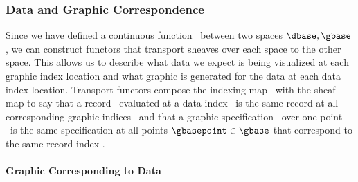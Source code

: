 \documentclass[journal]{IEEEtran}
\theoremstyle{definition}
\theoremstyle{remark}
\begin{document}
\subsubsection{Data and Graphic Correspondence}
Since we have defined a continuous function \vindex\ between two spaces $\dbase, \gbase$, we can construct functors that transport sheaves over each space to the other space\cite{harder2008lectures}. This allows us to describe what data we expect is being visualized at each graphic index location and what graphic is generated for the data at each data index location. Transport functors compose the indexing map \vindex\ with the sheaf map to say that a record \dsection\ evaluated at a data index \dbasepoint\ is the same record at all corresponding  graphic indices \gbasepoint\ and that a graphic specification \gsection\ over one point \gbasepoint\ is the same specification at all points $\gbasepoint \in \gbase$ that correspond to the same record index \dbasepoint.

\paragraph{\textbf{Graphic Corresponding to Data}}
\end{document}
